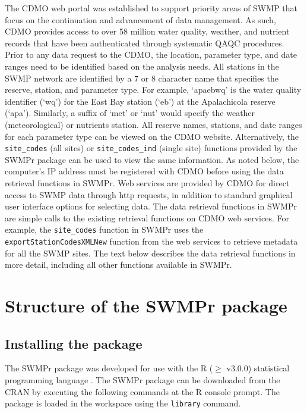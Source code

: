 \documentclass[10pt,letterpaper]{article}\usepackage[]{graphicx}\usepackage[]{color}
\begin{document}
The \gls{CDMO} web portal was established to support priority areas of \gls{SWMP} that focus on the continuation and advancement of data management.  As such, \gls{CDMO} provides access to over 58 million water quality, weather, and nutrient records that have been authenticated through systematic \gls{QAQC} procedures.    Prior to any data request to the \gls{CDMO}, the location, parameter type, and date ranges need to be identified based on the analysis needs. All stations in the \gls{SWMP} network are identified by a 7 or 8 character name that specifies the reserve, station, and parameter type.  For example, `apaebwq' is the water quality identifier (`wq') for the East Bay station (`eb') at the Apalachicola reserve (`apa').  Similarly, a suffix of `met' or `nut' would specify the weather (meteorological) or nutrients station.  All reserve names, stations, and date ranges for each parameter type can be viewed on the \gls{CDMO} website. Alternatively, the \texttt{site\_codes} (all sites) or \texttt{site\_codes\_ind} (single site) functions provided by the SWMPr package can be used to view the same information.  As noted below, the computer's IP address must be registered with \gls{CDMO} before using the data retrieval functions in SWMPr.  Web services are provided by \gls{CDMO} for direct access to \gls{SWMP} data through http requests, in addition to standard graphical user interface options for selecting data.  The data retrieval functions in SWMPr are simple calls to the existing retrieval functions on \gls{CDMO} web services.  For example, the \texttt{site\_codes} function in SWMPr uses the \texttt{exportStationCodesXMLNew} function from the web services to retrieve metadata for all the \gls{SWMP} sites.  The text below describes the data retrieval functions in more detail, including all other functions available in SWMPr.

\section*{Structure of the SWMPr package}

\subsection*{Installing the package}

The SWMPr package was developed for use with the R ($\geq$ v3.0.0) statistical programming language \cite{RDCT14}. The SWMPr package can be downloaded from the \gls{CRAN} by executing the following commands at the R console prompt.  The package is loaded in the workspace using the \texttt{library} command.
\end{document}
